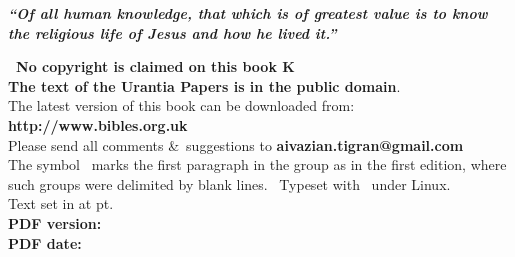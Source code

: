
\newpage

\newcommand{\serpimolot}{{\fontspec{Mortbats} K}}

\begin{center}
\begin{center}\parbox{7cm}{\bfseries\itshape ``Of all human knowledge, that which is of greatest value is to know the religious life of Jesus and how he lived it.'' }\end{center}
\parbox{0.9\linewidth}{\centering
\textbf{\upshape\nocopyright\ No copyright is claimed on this book \serpimolot\\
The text of the Urantia Papers is in the public domain}.\\[5pt]
The latest version of this book can be downloaded from:\\
{\upshape\bfseries http://www.bibles.org.uk}\\
Please send all comments \&\ suggestions to {\makeatletter\upshape\bfseries aivazian.tigran@gmail.com\makeatother}\\
The symbol \pc\ marks the first paragraph in the group as in the first edition, where such groups were delimited by blank lines.
\tux\ Typeset with \XeLaTeX\ under Linux.\\
Text set in \textbf{\urantiamainfont} at \urantiamainfontsize pt.\\[18pt]
\upshape\small\bfseries PDF version: \\
\upshape\small\bfseries PDF date: \mytoday{}\\
}
\end{center}

